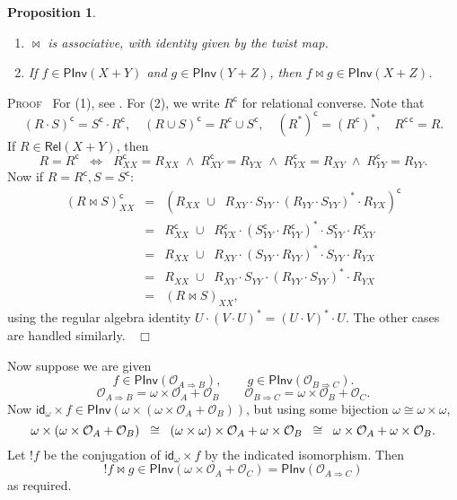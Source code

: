 \documentclass[a4paper,11pt]{article}
\newtheorem{proposition}{Proposition}[section]
\newcommand{\Occ}{\mathcal{O}}
\newcommand{\PInv}[1]{\mathsf{PInv}(#1)}
\newcommand{\Rel}[1]{\mathsf{Rel}(#1)}
\newcommand{\invcomp}{\bowtie}
\newcommand{\rconv}[1]{#1^{\mathsf{c}}}
\newcommand{\rdconv}[1]{#1^{\mathsf{c}\, \mathsf{c}}}
\newcommand{\ident}{\mathsf{id}}
\newenvironment{proof}{\textsc{Proof}\ }{$\;\; \Box$}
\begin{document}
\begin{proposition}
\label{invcomp}
\begin{enumerate}
\item $\invcomp$ is associative, with identity given by the twist map.
\item If $f \in \PInv{X + Y}$ and $g \in \PInv{Y+Z}$, then $f \invcomp
  g \in \PInv{X+Z}$.
\end{enumerate}
\end{proposition}
\begin{proof}
For (1), see \cite{AJ94a}. For (2), we write $\rconv{R}$ for relational
converse. Note that
\[ \rconv{(R \cdot S)} = \rconv{S} \cdot \rconv{R}, \quad \rconv{(R
  \cup S)} = \rconv{R} \cup \rconv{S}, \quad \rconv{(R^{\ast})} =
(\rconv{R})^{\ast}, \quad \rdconv{R} = R . \]
If $R \in \Rel{X+Y}$, then
\[ R = \rconv{R} \;\; \Longleftrightarrow \;\; \rconv{R_{XX}} = R_{XX}
\; \wedge \; \rconv{R_{XY}} = R_{YX} \; \wedge \; \rconv{R_{YX}} =
R_{XY} \; \wedge \; \rconv{R_{YY}} = R_{YY} . \]
Now if $R = \rconv{R}, S = \rconv{S}$:
\[ \begin{array}{rcl}
\rconv{(R \invcomp S)_{XX}} & = &  \rconv{(R_{XX} \; \cup \;\; R_{XY} \cdot S_{YY} \cdot
(R_{YY} \cdot S_{YY})^{\ast} \cdot R_{YX})} \\
& = & \rconv{R_{XX}} \; \cup \;\; \rconv{R_{YX}} \cdot (\rconv{S_{YY}} \cdot
\rconv{R_{YY}})^{\ast} \cdot
\rconv{S_{YY}} \cdot \rconv{R_{XY}} \\
& = & R_{XX} \; \cup \;\; R_{XY}  \cdot
(S_{YY} \cdot R_{YY})^{\ast} \cdot S_{YY} \cdot R_{YX} \\
& = & R_{XX} \; \cup \;\; R_{XY} \cdot S_{YY} \cdot
(R_{YY} \cdot S_{YY})^{\ast} \cdot R_{YX} \\
& = & (R \invcomp S)_{XX} ,
\end{array} \]
using the regular algebra identity $U \cdot (V \cdot U)^{\ast} = (U
\cdot V)^{\ast} \cdot U$.
The other cases are handled similarly.
\end{proof}

\noindent Now suppose we are given
\[ f \in \PInv{\Occ_{A \Rightarrow B}}, \qquad g \in \PInv{\Occ_{B
    \Rightarrow C}} . \]
\[ \Occ_{A \Rightarrow B} = \omega \times \Occ_A + \Occ_B \qquad
\Occ_{B \Rightarrow C} = \omega \times \Occ_B + \Occ_C . \]
Now $\ident_{\omega} \times f \in  \PInv{\omega \times (\omega \times \Occ_A
  + \Occ_B )}$, but using some bijection $\omega \cong \omega \times \omega$,
\[
\omega \times (\omega \times \Occ_A
  + \Occ_B )
\;\; \cong \;\; (\omega \times \omega ) \times \Occ_A + \omega \times \Occ_B
\\
\;\; \cong \;\; \omega  \times \Occ_A + \omega \times \Occ_B .
\]
Let $!f$ be the conjugation of $\ident_{\omega}{\times} f$ by the
indicated isomorphism. Then
\[ !f \invcomp g \in \PInv{\omega \times
  \Occ_A + \Occ_C} = \PInv{\Occ_{A \Rightarrow C}} \]
as required.
\end{document}
